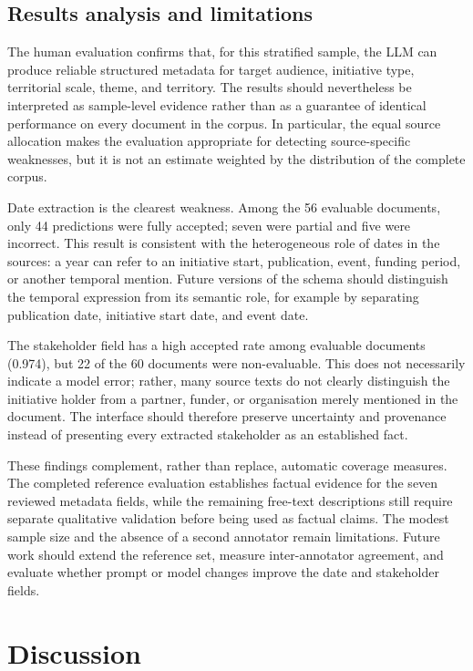 \documentclass[
11pt,
english,
singlespacing,
headsepline,
]{MastersDoctoralThesis}
\begin{document}
\section{Results analysis and limitations}

The human evaluation confirms that, for this stratified sample, the LLM can
produce reliable structured metadata for target audience, initiative type,
territorial scale, theme, and territory. The results should nevertheless be
interpreted as sample-level evidence rather than as a guarantee of identical
performance on every document in the corpus. In particular, the equal source
allocation makes the evaluation appropriate for detecting source-specific
weaknesses, but it is not an estimate weighted by the distribution of the
complete corpus.

Date extraction is the clearest weakness. Among the 56 evaluable documents,
only 44 predictions were fully accepted; seven were partial and five were
incorrect. This result is consistent with the heterogeneous role of dates in
the sources: a year can refer to an initiative start, publication, event,
funding period, or another temporal mention. Future versions of the schema
should distinguish the temporal expression from its semantic role, for example
by separating publication date, initiative start date, and event date.

The stakeholder field has a high accepted rate among evaluable documents
(0.974), but 22 of the 60 documents were non-evaluable. This does not
necessarily indicate a model error; rather, many source texts do not clearly
distinguish the initiative holder from a partner, funder, or organisation merely
mentioned in the document. The interface should therefore preserve uncertainty
and provenance instead of presenting every extracted stakeholder as an
established fact.

These findings complement, rather than replace, automatic coverage measures.
The completed reference evaluation establishes factual evidence for the seven
reviewed metadata fields, while the remaining free-text descriptions still
require separate qualitative validation before being used as factual claims.
The modest sample size and the absence of a second annotator remain limitations.
Future work should extend the reference set, measure inter-annotator agreement,
and evaluate whether prompt or model changes improve the date and stakeholder
fields.

\chapter{Discussion}
\end{document}
